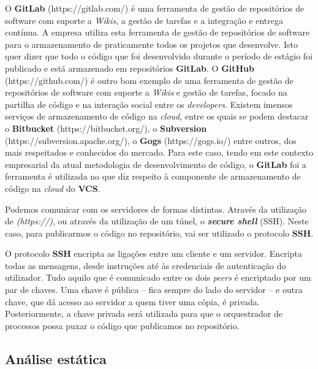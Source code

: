 \hspace{1cm}O \textbf{GitLab} (https://gitlab.com/) é uma ferramenta de gestão de repositórios de software com suporte a \textit{Wikis}, a gestão de tarefas e a integração e entrega contínua. A empresa utiliza esta ferramenta de gestão de repositórios de software para o armazenamento de praticamente todos os projetos que desenvolve. Isto quer dizer que todo o código que foi desenvolvido durante o período de estágio foi publicado e está armazenado em repositórios \textbf{GitLab}. O \textbf{GitHub} (https://github.com/) é outro bom exemplo de uma ferramenta de gestão de repositórios de software com suporte a \textit{Wikis} e gestão de tarefas, focado na partilha de código e na interação social entre os \textit{developers}. Existem imensos serviços de armazenamento de código na \textit{cloud}, entre os quais se podem destacar o \textbf{Bitbucket} (https://bitbucket.org/), o \textbf{Subversion} (https://subversion.apache.org/), o \textbf{Gogs} (https://gogs.io/) entre outros, dos mais respeitados e conhecidos do mercado. Para este caso, tendo em este contexto empresarial da atual metodologia de desenvolvimento de código, o \textbf{GitLab} foi a ferramenta é utilizada no que diz respeito à componente de armazenamento de código na \textit{cloud} do \textbf{VCS}.

\hspace{1cm}Podemos comunicar com os servidores de formas distintas. Através da utilização de \textit{(https://)}, ou através da utilização de um túnel, o \textit{\textbf{secure shell}} (SSH). Neste caso, para publicarmos o código no repositório, vai ser utilizado o protocolo \textbf{SSH}. 

\hspace{1cm}O protocolo \textbf{SSH} encripta as ligações entre um cliente e um servidor. Encripta todas as mensagens, desde instruções até às credenciais de autenticação do utilizador. Tudo aquilo que é comunicado entre os dois \textit{peers} é encriptado por um par de chaves. Uma chave é pública -- fica sempre do lado do servidor -- e outra chave, que dá acesso ao servidor a quem tiver uma cópia, é privada. Posteriormente, a chave privada será utilizada para que o orquestrador de processos possa puxar o código que publicamos no repositório.  

\subsection{Análise estática}

